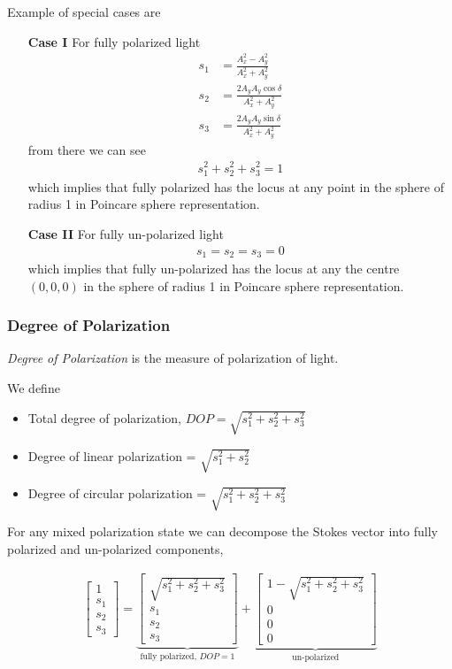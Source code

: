 \documentclass[11pt,a4paper]{article}
\numberwithin{equation}{section}
\begin{document}
Example of special cases are
\begin{enumerate}
	\item[\textbf{Case I}] For fully polarized light
	\begin{align}
		s_1&=\frac{A_x^2 - A_y^2}{A_x^2 + A_y^2}\\
		s_2&=\frac{2A_yA_y\cos\delta}{A_x^2 + A_y^2}\\
		s_3&=\frac{2A_yA_y\sin\delta}{A_x^2 + A_y^2}
	\end{align}
from there we can see
\begin{align}
	s_1^2+s_2^2+s_3^2=1 \label{eq:1.29}
\end{align}
which implies that fully polarized has the locus at any point in the sphere of radius 1 in Poincare sphere representation.

\item[\textbf{Case II}] For fully un-polarized light
\begin{align}
	s_1=s_2=s_3=0
\end{align}
which implies that fully un-polarized has the locus at any the centre $(0,0,0)$ in the sphere of radius 1 in Poincare sphere representation.
\end{enumerate}

\subsubsection{Degree of Polarization}
\textit{Degree of Polarization} is the measure of polarization of light.

We define
\begin{itemize}
	\item Total degree of polarization, $DOP = \sqrt{s_1^2+s_2^2+s_3^2}$
	\item Degree of linear polarization = $\sqrt{s_1^2+s_2^2}$
	\item Degree of circular polarization = $\sqrt{s_1^2+s_2^2+s_3^2}$
\end{itemize}

For any mixed polarization state we can decompose the Stokes vector into fully polarized and un-polarized components,

\begin{align}
	\begin{bmatrix} 1\\ s_1\\ s_2\\ s_3\end{bmatrix} = 
	\underbrace{\begin{bmatrix} \sqrt{s_1^2+s_2^2+s_3^2}\\ s_1\\ s_2\\ s_3\end{bmatrix}}_{\text{fully polarized, } DOP = 1} +
	\underbrace{\begin{bmatrix} 1-\sqrt{s_1^2+s_2^2+s_3^2}\\0\\ 0\\ 0\end{bmatrix}}_{\text{un-polarized}}
\end{align}
\end{document}
